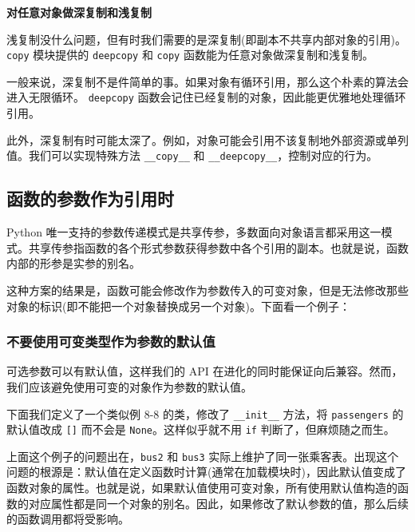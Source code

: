 \noindent\textbf{对任意对象做深复制和浅复制}

浅复制没什么问题，但有时我们需要的是深复制(即副本不共享内部对象的引用)。 \texttt{copy} 模块提供的 \texttt{deepcopy} 和 \texttt{copy} 函数能为任意对象做深复制和浅复制。



一般来说，深复制不是件简单的事。如果对象有循环引用，那么这个朴素的算法会进入无限循环。 \texttt{deepcopy} 函数会记住已经复制的对象，因此能更优雅地处理循环引用。



此外，深复制有时可能太深了。例如，对象可能会引用不该复制地外部资源或单列值。我们可以实现特殊方法 \texttt{\_\_copy\_\_} 和 \texttt{\_\_deepcopy\_\_}，控制对应的行为。

\subsection{函数的参数作为引用时}

Python 唯一支持的参数传递模式是共享传参，多数面向对象语言都采用这一模式。共享传参指函数的各个形式参数获得参数中各个引用的副本。也就是说，函数内部的形参是实参的别名。

这种方案的结果是，函数可能会修改作为参数传入的可变对象，但是无法修改那些对象的标识(即不能把一个对象替换成另一个对象)。下面看一个例子：



\subsubsection{不要使用可变类型作为参数的默认值}

可选参数可以有默认值，这样我们的 API 在进化的同时能保证向后兼容。然而，我们应该避免使用可变的对象作为参数的默认值。

下面我们定义了一个类似例 8-8 的类，修改了 \texttt{\_\_init\_\_} 方法，将 \texttt{passengers} 的默认值改成 \texttt{[]} 而不会是 \texttt{None}。这样似乎就不用 \texttt{if} 判断了，但麻烦随之而生。



上面这个例子的问题出在，\texttt{bus2} 和 \texttt{bus3} 实际上维护了同一张乘客表。出现这个问题的根源是：默认值在定义函数时计算(通常在加载模块时)，因此默认值变成了函数对象的属性。也就是说，如果默认值使用可变对象，所有使用默认值构造的函数的对应属性都是同一个对象的别名。因此，如果修改了默认参数的值，那么后续的函数调用都将受影响。

